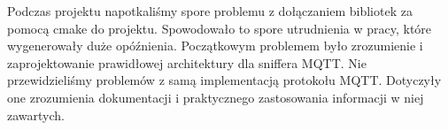 Podczas projektu napotkaliśmy spore problemu z dołączaniem bibliotek za pomocą cmake do projektu. 
Spowodowało to spore utrudnienia w pracy, które wygenerowały duże opóźnienia. 
Początkowym problemem było zrozumienie i zaprojektowanie prawidłowej architektury dla sniffera MQTT. 
Nie przewidzieliśmy problemów z samą implementacją protokołu MQTT. 
Dotyczyły one zrozumienia dokumentacji i praktycznego zastosowania informacji w niej zawartych. 
